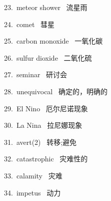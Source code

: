 \documentclass[a4paper, 12pt]{article}
\begin{document}
\begin{multicols}{2}
\begin{flushleft}
23.\ meteor shower \ 流星雨
\end{flushleft}

\begin{flushleft}
24.\ comet \ 彗星
\end{flushleft}
\end{multicols}

\begin{multicols}{2}
\begin{flushleft}
25.\ carbon monoxide \ 一氧化碳
\end{flushleft}

\begin{flushleft}
26.\ sulfur dioxide \ 二氧化硫
\end{flushleft}
\end{multicols}

\begin{multicols}{2}
\begin{flushleft}
27.\ seminar \ 研讨会
\end{flushleft}

\begin{flushleft}
28.\ unequivocal \ 确定的，明确的
\end{flushleft}
\end{multicols}

\begin{multicols}{2}
\begin{flushleft}
29.\ El Nino \ 厄尔尼诺现象
\end{flushleft}

\begin{flushleft}
30.\ La Nina \ 拉尼娜现象
\end{flushleft}
\end{multicols}

\begin{multicols}{2}
\begin{flushleft}
31.\ avert(2) \ 转移;避免
\end{flushleft}

\begin{flushleft}
32.\ catastrophic \ 灾难性的
\end{flushleft}
\end{multicols}

\begin{multicols}{2}
\begin{flushleft}
33.\ calamity \ 灾难
\end{flushleft}

\begin{flushleft}
34.\ impetus \ 动力
\end{flushleft}
\end{multicols}
\end{document}
